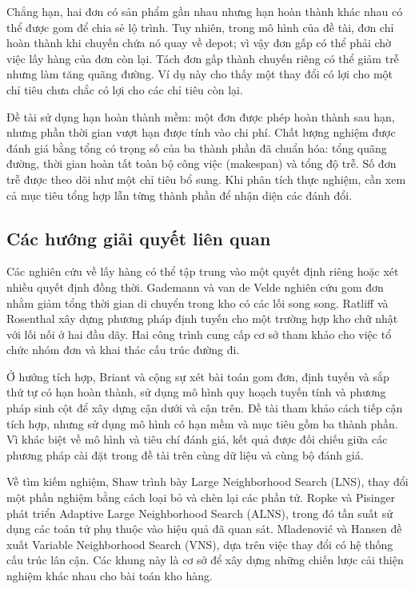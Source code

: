Chẳng hạn, hai đơn có sản phẩm gần nhau nhưng hạn hoàn thành khác nhau có thể được gom để chia sẻ lộ trình. Tuy nhiên, trong mô hình của đề tài, đơn chỉ hoàn thành khi chuyến chứa nó quay về depot; vì vậy đơn gấp có thể phải chờ việc lấy hàng của đơn còn lại. Tách đơn gấp thành chuyến riêng có thể giảm trễ nhưng làm tăng quãng đường. Ví dụ này cho thấy một thay đổi có lợi cho một chỉ tiêu chưa chắc có lợi cho các chỉ tiêu còn lại.

Đề tài sử dụng hạn hoàn thành mềm: một đơn được phép hoàn thành sau hạn, nhưng phần thời gian vượt hạn được tính vào chi phí. Chất lượng nghiệm được đánh giá bằng tổng có trọng số của ba thành phần đã chuẩn hóa: tổng quãng đường, thời gian hoàn tất toàn bộ công việc (makespan) và tổng độ trễ. Số đơn trễ được theo dõi như một chỉ tiêu bổ sung. Khi phân tích thực nghiệm, cần xem cả mục tiêu tổng hợp lẫn từng thành phần để nhận diện các đánh đổi.

\subsection{Các hướng giải quyết liên quan}
Các nghiên cứu về lấy hàng có thể tập trung vào một quyết định riêng hoặc xét nhiều quyết định đồng thời. Gademann và van de Velde \cite{gademann2005} nghiên cứu gom đơn nhằm giảm tổng thời gian di chuyển trong kho có các lối song song. Ratliff và Rosenthal \cite{ratliff1983} xây dựng phương pháp định tuyến cho một trường hợp kho chữ nhật với lối nối ở hai đầu dãy. Hai công trình cung cấp cơ sở tham khảo cho việc tổ chức nhóm đơn và khai thác cấu trúc đường đi.

Ở hướng tích hợp, Briant và cộng sự \cite{briant2023} xét bài toán gom đơn, định tuyến và sắp thứ tự có hạn hoàn thành, sử dụng mô hình quy hoạch tuyến tính và phương pháp sinh cột để xây dựng cận dưới và cận trên. Đề tài tham khảo cách tiếp cận tích hợp, nhưng sử dụng mô hình có hạn mềm và mục tiêu gồm ba thành phần. Vì khác biệt về mô hình và tiêu chí đánh giá, kết quả được đối chiếu giữa các phương pháp cài đặt trong đề tài trên cùng dữ liệu và cùng bộ đánh giá.

Về tìm kiếm nghiệm, Shaw \cite{shaw1998} trình bày Large Neighborhood Search (LNS), thay đổi một phần nghiệm bằng cách loại bỏ và chèn lại các phần tử. Ropke và Pisinger \cite{ropke2006} phát triển Adaptive Large Neighborhood Search (ALNS), trong đó tần suất sử dụng các toán tử phụ thuộc vào hiệu quả đã quan sát. Mladenović và Hansen \cite{mladenovic1997} đề xuất Variable Neighborhood Search (VNS), dựa trên việc thay đổi có hệ thống cấu trúc lân cận. Các khung này là cơ sở để xây dựng những chiến lược cải thiện nghiệm khác nhau cho bài toán kho hàng.

